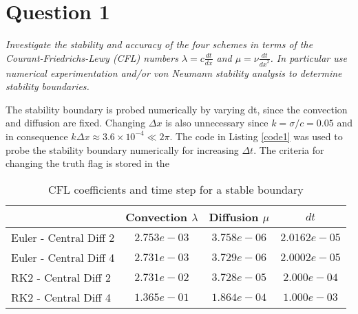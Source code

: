 \section*{Question 1}
\emph{Investigate the stability and accuracy of the four schemes in terms of the Courant-Friedrichs-Lewy (CFL) numbers $\lambda = c \tfrac{dt}{dx}$ and $\mu = \nu \tfrac{dt}{{dx}^2}$. In particular use numerical experimentation and/or von Neumann stability analysis to determine stability boundaries.}



The stability boundary is probed numerically by varying dt, since the convection and diffusion are fixed. Changing $\Delta x$ is also unnecessary since $k = \sigma/c = 0.05$ and in consequence $k \Delta x \approx 3.6\times 10^{-4} \ll 2\pi$. The code in Listing \ref{code1} was used to probe the stability boundary numerically for increasing $\Delta t$. The criteria for changing the truth flag is stored in the 



\begin{table}[ht!]
\caption{CFL coefficients and time step for a stable boundary}
\label{tbl1}
\centering
\begin{tabular}{l|c|c|c}
& Convection $\lambda$ & Diffusion $\mu$  & $dt$\\ \hline
Euler - Central Diff 2 & $2.753e-03$ & $3.758e-06$ & $2.0162e-05$\\
Euler - Central Diff 4 & $2.731e-03$ & $3.729e-06$ & $2.0002e-05$\\
RK2 - Central Diff 2 & $2.731e-02$ & $ 3.728e-05$ & $2.000e-04$ \\
RK2 - Central Diff 4 & $1.365e-01$ & $1.864e-04$ & $1.000e-03$\\
\end{tabular}
\end{table}


%
%
%
%
